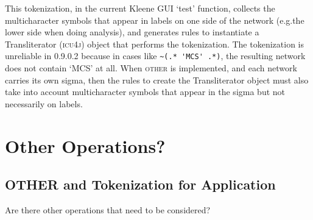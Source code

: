 \documentclass[letterpaper,11pt]{article}
\providecommand{\acro}{}\renewcommand{\acro}{\textsc}
\begin{document}
This tokenization, in the current Kleene GUI `test' function, collects the multicharacter symbols
that appear in labels on one side of the network (e.g.\@ the lower side when doing analysis), and generates
rules to instantiate a Transliterator (\acro{icu4j}) object that performs the tokenization.  The tokenization
is unreliable in 0.9.0.2 because in cases like \verb!~(.* 'MCS' .*)!, the resulting network does not contain
`MCS' at all.  When \acro{other} is implemented, and each network carries its own sigma, then the rules to
create the Transliterator object must also take into account multicharacter symbols that appear in the sigma
but not necessarily on labels.

\section{Other Operations?}

\subsection{OTHER and Tokenization for Application}

Are there other operations that need to be considered?
\end{document}
